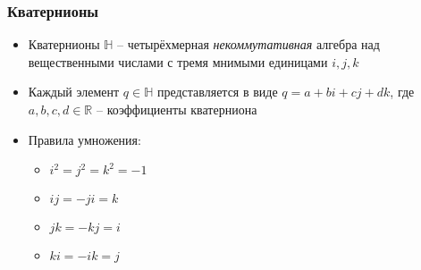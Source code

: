 \documentclass[10pt]{beamer}
\begin{document}
\begin{frame}[fragile]
\frametitle{Кватернионы}
\begin{itemize}
\item Кватернионы \begin{math}\mathbb H\end{math} -- четырёхмерная \textit{некоммутативная} алгебра над вещественными числами с тремя мнимыми единицами \begin{math}i, j, k\end{math}
\item Каждый элемент \begin{math}q\in \mathbb H\end{math} представляется в виде \begin{math}q = a + bi + cj + dk\end{math}, где \begin{math}a, b, c, d \in \mathbb R\end{math} -- коэффициенты кватерниона
\pause
\item Правила умножения:
\begin{itemize}
\item \begin{math}i^2=j^2=k^2=-1\end{math}
\item \begin{math}ij=-ji=k\end{math}
\item \begin{math}jk=-kj=i\end{math}
\item \begin{math}ki=-ik=j\end{math}
\end{itemize}
\end{itemize}
\end{frame}
\end{document}
